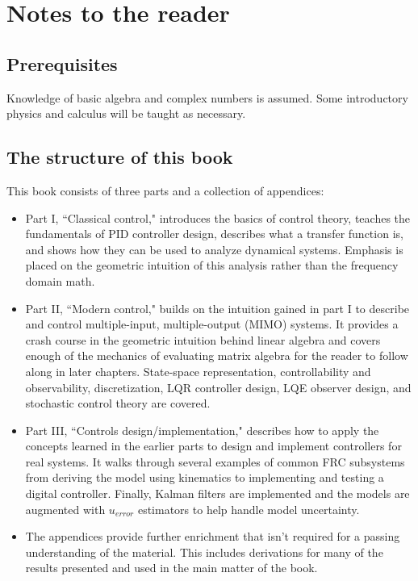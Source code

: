
\setcounter{chapter}{-1}
\chapter{Notes to the reader}

\section{Prerequisites}

Knowledge of basic algebra and complex numbers is assumed. Some introductory
physics and calculus will be taught as necessary.

\section{The structure of this book}

This book consists of three parts and a collection of appendices:

\begin{itemize}
  \item Part I, ``Classical control," introduces the basics of control theory,
    teaches the fundamentals of PID controller design, describes what a transfer
    function is, and shows how they can be used to analyze dynamical systems.
    Emphasis is placed on the geometric intuition of this analysis rather than
    the frequency domain math.
  \item Part II, ``Modern control," builds on the intuition gained in part I to
    describe and control multiple-input, multiple-output (MIMO) systems. It
    provides a crash course in the geometric intuition behind linear algebra and
    covers enough of the mechanics of evaluating matrix algebra for the reader
    to follow along in later chapters. State-space representation,
    controllability and observability, discretization, LQR controller design,
    LQE observer design, and stochastic control theory are covered.
  \item Part III, ``Controls design/implementation," describes how to apply the
    concepts learned in the earlier parts to design and implement controllers
    for real systems. It walks through several examples of common FRC subsystems
    from deriving the model using kinematics to implementing and testing a
    digital controller. Finally, Kalman filters are implemented and the models
    are augmented with $u_{error}$ estimators to help handle model uncertainty.
  \item The appendices provide further enrichment that isn't required for a
    passing understanding of the material. This includes derivations for many of
    the results presented and used in the main matter of the book.
\end{itemize}

